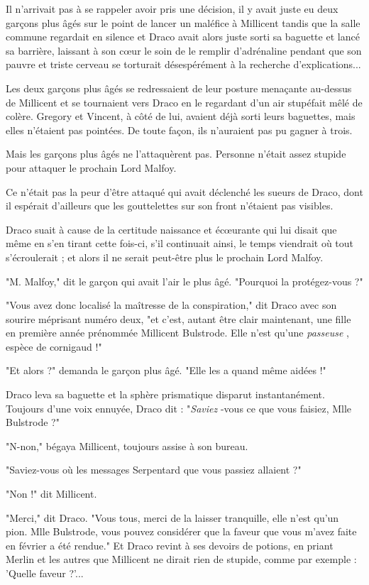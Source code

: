 Il n'arrivait pas à se rappeler avoir pris une décision, il y avait juste eu deux garçons plus âgés sur le point de lancer un maléfice à Millicent tandis que la salle commune regardait en silence et Draco avait alors juste sorti sa baguette et lancé sa barrière, laissant à son cœur le soin de le remplir d'adrénaline pendant que son pauvre et triste cerveau se torturait désespérément à la recherche d'explications...

Les deux garçons plus âgés se redressaient de leur posture menaçante au-dessus de Millicent et se tournaient vers Draco en le regardant d'un air stupéfait mêlé de colère. Gregory et Vincent, à côté de lui, avaient déjà sorti leurs baguettes, mais elles n'étaient pas pointées. De toute façon, ils n'auraient pas pu gagner à trois.

Mais les garçons plus âgés ne l'attaquèrent pas. Personne n'était assez stupide pour attaquer le prochain Lord Malfoy.

Ce n'était pas la peur d'être attaqué qui avait déclenché les sueurs de Draco, dont il espérait d'ailleurs que les gouttelettes sur son front n'étaient pas visibles.

Draco suait à cause de la certitude naissance et écœurante qui lui disait que même en s'en tirant cette fois-ci, s'il continuait ainsi, le temps viendrait où tout s'écroulerait ; et alors il ne serait peut-être plus le prochain Lord Malfoy.

"M. Malfoy," dit le garçon qui avait l'air le plus âgé. "Pourquoi la protégez-vous ?"

"Vous avez donc localisé la maîtresse de la conspiration," dit Draco avec son sourire méprisant numéro deux, "et c'est, autant être clair maintenant, une fille en première année prénommée Millicent Bulstrode. Elle n'est qu'une \emph{passeuse} , espèce de cornigaud !"

"Et alors ?" demanda le garçon plus âgé. "Elle les a quand même aidées !"

Draco leva sa baguette et la sphère prismatique disparut instantanément. Toujours d'une voix ennuyée, Draco dit : "\emph{Saviez} -vous ce que vous faisiez, Mlle Bulstrode ?"

"N-non," bégaya Millicent, toujours assise à son bureau.

"Saviez-vous où les messages Serpentard que vous passiez allaient ?"

"Non !" dit Millicent.

"Merci," dit Draco. "Vous tous, merci de la laisser tranquille, elle n'est qu'un pion. Mlle Bulstrode, vous pouvez considérer que la faveur que vous m'avez faite en février a été rendue." Et Draco revint à ses devoirs de potions, en priant Merlin et les autres que Millicent ne dirait rien de stupide, comme par exemple : 'Quelle faveur ?'...

